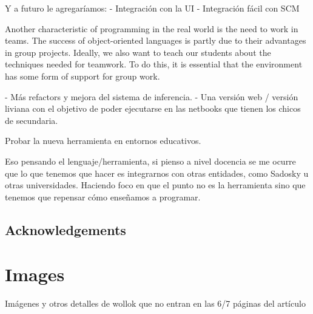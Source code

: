 \documentclass[preprint,10pt]{sigplanconf}
\begin{document}


Y a futuro le agregaríamos:
- Integración con la UI
- Integración fácil con SCM

Another characteristic of programming in the real world is the need to work in
teams. The success of object-oriented languages is partly due to their advantages in
group projects. Ideally, we also want to teach our students about the techniques
needed for teamwork. To do this, it is essential that the environment has some form
of support for group work. \cite{kolling_problem_1999}

- Más refactors y mejora del sistema de inferencia.
- Una versión web / versión liviana con el objetivo de poder ejecutarse en las netbooks que tienen los chicos de secundaria.

Probar la nueva herramienta en entornos educativos.

Eso pensando el lenguaje/herramienta, si pienso a nivel docencia se me ocurre que lo que tenemos que hacer es integrarnos con otras entidades, como Sadosky u otras universidades.
Haciendo foco en que el punto no es la herramienta sino que tenemos que repensar cómo enseñamos a programar.

\subsection*{Acknowledgements} 

% 
% 

% 

{
\small


}

\newpage
\appendix
\section{Images}
Imágenes y otros detalles de wollok que no entran en las 6/7 páginas del artículo
\end{document}
